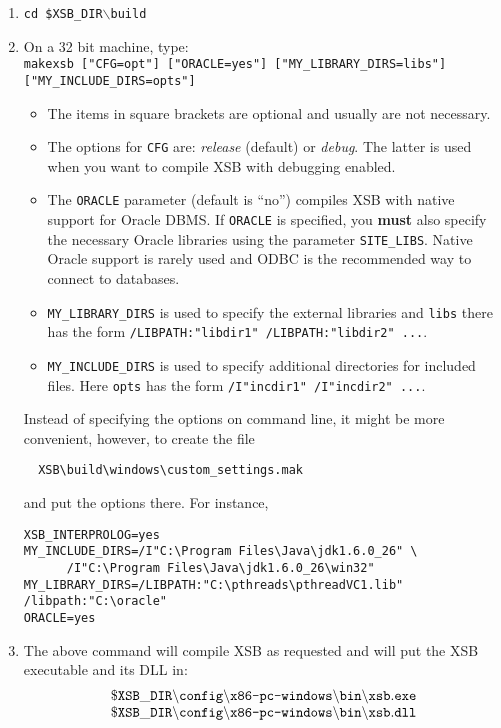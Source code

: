 \begin{enumerate}
\item
   {\tt cd \$XSB\_DIR$\backslash$build}  
\item
  On a 32 bit machine, type:\\
  {\tt makexsb ["CFG=opt"] ["ORACLE=yes"] ["MY\_LIBRARY\_DIRS=libs"] ["MY\_INCLUDE\_DIRS=opts"]}
  \begin{itemize}
  \item The items in square brackets are optional and usually are not
    necessary.
  \item The options for {\tt CFG} are: \emph{release} (default) or \emph{debug}.  The
    latter is used when you want to compile XSB with debugging enabled.
  \item The {\tt ORACLE} parameter (default is ``no'') compiles XSB with
    native support for Oracle DBMS. If {\tt ORACLE} is
    specified, you {\bf must} also specify the necessary Oracle libraries
    using the parameter {\tt SITE\_LIBS}.
    Native Oracle support is rarely used and ODBC is the recommended way to
    connect to databases.
  \item \texttt{MY\_LIBRARY\_DIRS} is used to specify the external
    libraries and \texttt{libs} there has the form  \texttt{/LIBPATH:"libdir1"
    /LIBPATH:"libdir2" ...}.  
  \item \texttt{MY\_INCLUDE\_DIRS} is used to specify additional
    directories for included files. Here \texttt{opts} has the form
    \texttt{/I"incdir1" /I"incdir2" ...}.  
  \end{itemize}
  Instead of specifying the options on command line,
  it might be more convenient, however, to create the file
\begin{verbatim}
  XSB\build\windows\custom_settings.mak  
\end{verbatim}
  and put the options there. For instance,
\begin{verbatim}
XSB_INTERPROLOG=yes 
MY_INCLUDE_DIRS=/I"C:\Program Files\Java\jdk1.6.0_26" \
      /I"C:\Program Files\Java\jdk1.6.0_26\win32" 
MY_LIBRARY_DIRS=/LIBPATH:"C:\pthreads\pthreadVC1.lib" /libpath:"C:\oracle"
ORACLE=yes
\end{verbatim}
   
 \item The above command will compile XSB as requested and will put the XSB 
   executable and its DLL in:
\[
\begin{array}{l}
 \tt
 \$XSB\_DIR\backslash{}config\backslash\texttt{x86-pc-windows}\backslash{}bin\backslash{}xsb.exe
\\
 \tt
 \$XSB\_DIR\backslash{}config\backslash\texttt{x86-pc-windows}\backslash{}bin\backslash{}xsb.dll
 \end{array}
\]


\end{enumerate}

